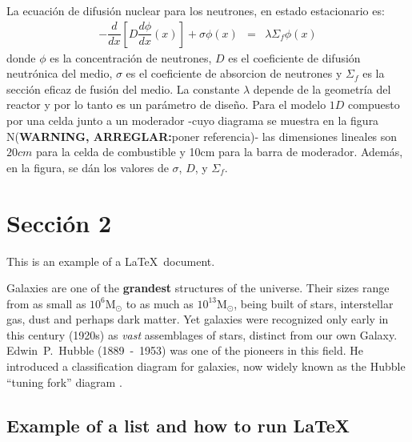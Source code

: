 \documentclass[11pt,a4paper]{emulateapj}
\def \warn {{\sffamily\bfseries\large WARNING, ARREGLAR:}}
\begin{document}
La ecuación de difusión nuclear para los neutrones, en estado estacionario es:
\begin{eqnarray}
  -\dfrac{d}{dx}[D \dfrac{d\phi}{dx}(x)] + \sigma \phi(x)  &=& \lambda  \Sigma_f \phi(x)
\end{eqnarray}
donde $\phi$ es la concentración de neutrones, $D$ es el coeficiente de difusión neutrónica del
medio, $\sigma$ es el coeficiente de absorcion de neutrones y $\Sigma_f$ es la sección eficaz de fusión del
medio. La constante $\lambda$ depende de la geometría del reactor y por lo tanto es un parámetro
de diseño.
Para el modelo $1D$ compuesto por una celda junto a un moderador 
-cuyo diagrama se muestra en la figura N(\warn poner referencia)- las dimensiones 
lineales son $20cm$ para la celda de combustible y 10cm para la barra de moderador.
Además, en la figura, se dán los valores de $\sigma$, $D$, y $\Sigma_f$.

\section{Sección 2}

This is an example of a \LaTeX\ document.  

\medskip

Galaxies are one of the \textbf{grandest} structures of the universe.
Their sizes range from as small as $10^6 \text{M}_\odot$ to as much as
$10^{13} \text{M}_\odot$, being built of stars, interstellar gas, dust
and perhaps dark matter. Yet galaxies were recognized only early in
this century (1920s) as \textit{vast} assemblages of stars, distinct
from our own Galaxy. Edwin~P.~Hubble (1889~-~1953) was one of the
pioneers in this field. He introduced a classification diagram for
galaxies, now widely known as the Hubble ``tuning fork'' diagram
\cite[][see Figure~\ref{fig:hubble_dia} for a revised Hubble
diagram]{hub36}.


%
%
\subsection{Example of a list and how to run \LaTeX} 
\end{document}
